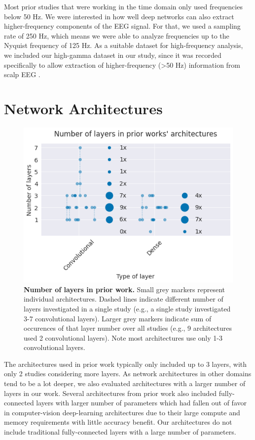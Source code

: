 Most prior studies that were working in the time domain only used
frequencies below 50 Hz. We were interested in how well deep networks
can also extract higher-frequency components of the EEG
signal. For that, we used a sampling rate of 250 Hz, which means we were
able to analyze frequencies up to the Nyquist frequency of 125 Hz. As a
suitable dataset for high-frequency analysis, we
included our high-gamma dataset in our study, since it was recorded
specifically to allow extraction of higher-frequency (\textgreater50 Hz)
information from scalp EEG \citep{schirrmeisterdeephbm2017}.


\section{Network Architectures}\label{network-architectures}

    

\begin{figure}[ht]
    \myfloatalign
    \includegraphics[width=0.9\linewidth]{latex_images/PriorWork_files/PriorWork_11_0.png}
    \caption[Number of layers in prior work.]{
\textbf{Number of layers in prior work.} Small grey markers represent
individual architectures. Dashed lines indicate different number of
layers investigated in a single study (e.g., a single study investigated
3-7 convolutional layers). Larger grey markers indicate sum of
occurences of that layer number over all studies (e.g., 9 architectures
used 2 convolutional layers). Note most architectures use only 1-3
convolutional layers.}\label{layernum_fig}
\end{figure}

    The architectures used in prior work typically only included up to 3
layers, with only 2 studies considering more layers. As network
architectures in other domains tend to be a lot deeper, we also
evaluated architectures with a larger number of layers in our work.
Several architectures from prior work also included fully-connected
layers with larger number of parameters which had fallen out of favor in
computer-vision deep-learning architectures due to their large compute
and memory requirements with little accuracy benefit. Our architectures
do not include traditional fully-connected layers with a large number of
parameters.



